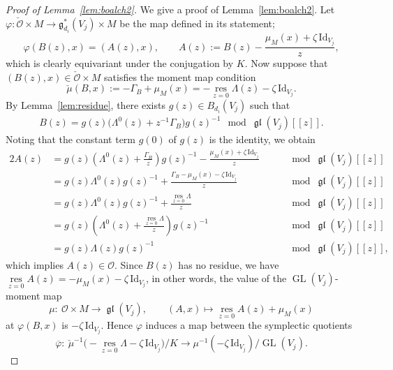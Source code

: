 \documentclass[pdftex]{sigma}
\numberwithin{equation}{section}
\theoremstyle{definition}
\newcommand{\lemref}[1]{Lemma~\ref{#1}}
\newcommand{\GL}{\operatorname{GL}} %
\newcommand{\gl}{\operatorname{\mathfrak{gl}}}
\newcommand{\g}{\mathfrak{g}} %
\newcommand{\unit}{\mathrm{Id}}
\newcommand{\ov}{\overline}
\newcommand{\res}{\operatorname*{res}}
\newcommand{\bO}{\mathcal{O}}
\begin{document}
\begin{proof}[Proof of \lemref{lem:boalch2}]
We give a proof of \lemref{lem:boalch2}.
Let $\varphi \colon \check{\bO} \times M \to \g^*_{d_i}(V_j) \times M$
be the map def\/ined in its statement;
\[
\varphi(B(z), x) =(A(z),x), \qquad
A(z) := B(z)-\frac{\mu_M(x)+\zeta\,\unit_{V_j}}{z},
\]
which is clearly equivariant under the conjugation by $K$.
Now suppose that $(B(z),x) \in \check{\bO} \times M$
satisf\/ies the moment map condition
\[
\check{\mu}(B,x):=-\Gamma_B + \mu_M(x)
= -\res_{z=0}\Lambda(z)-\zeta\,\unit_{V_j}.
\]
By \lemref{lem:residue},
there exists $g(z) \in B_{d_i}(V_j)$ such that
\begin{gather}\label{eq:residue2}
B(z) = g(z)\big(\Lambda^0(z) + z^{-1}\Gamma_B\big)g(z)^{-1}
\mod \gl(V_j)[[z]].
\end{gather}
Noting that the constant term $g(0)$ of $g(z)$ is the identity,
we obtain
\begin{alignat*}{2}
A(z)
&=
g(z)\left( \Lambda^0(z) + \frac{\Gamma_B}{z}\right) g(z)^{-1}
-\frac{\mu_M(x)+\zeta\,\unit_{V_j}}{z}
&\quad &\mod \gl(V_j)[[z]] \\
&=
g(z) \Lambda^0(z) g(z)^{-1}
+\frac{\Gamma_B -\mu_M(x) -\zeta\,\unit_{V_j}}{z}
&\quad &\mod \gl(V_j)[[z]] \\
&=
g(z) \Lambda^0(z) g(z)^{-1}
+\frac{\res\limits_{z=0}\Lambda}{z}
&\quad &\mod \gl(V_j)[[z]] \\
&=
g(z) \left( \Lambda^0(z) + \frac{\res\limits_{z=0}\Lambda}{z} \right) g(z)^{-1}
&\quad &\mod \gl(V_j)[[z]] \\
&=g(z)\Lambda(z)g(z)^{-1}
&\quad &\mod \gl(V_j)[[z]],
\end{alignat*}
which implies $A(z) \in \bO$.
Since $B(z)$ has no residue,
we have $\res\limits_{z=0}A(z)=-\mu_M(x) -\zeta\,\unit_{V_j}$,
in other words, the value of the $\GL(V_j)$-moment map
\[
\mu \colon \ \bO \times M \to \gl(V_j),
\qquad (A,x) \mapsto \res_{z=0}A(z) + \mu_M(x)
\]
at $\varphi(B,x)$ is $-\zeta\,\unit_{V_j}$.
Hence $\varphi$ induces a map between the symplectic quotients
\[
\ov{\varphi}\colon \
\check{\mu}^{-1}\Big(-\res_{z=0}\Lambda -\zeta\,\unit_{V_j}\Big)/K
\longrightarrow \mu^{-1}(-\zeta\,\unit_{V_j})/\GL(V_j).
\]


\end{proof}
\end{document}
